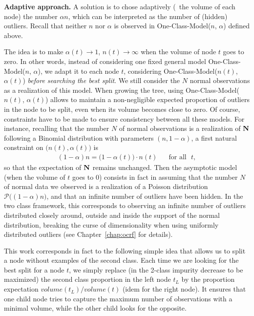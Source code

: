 \textbf{Adaptive approach.}
%
A solution is to chose adaptively (\wrt~the volume of each node) the number $\alpha n$, which can be interpreted as the number of (hidden) outliers. Recall that neither $n$ nor $\alpha$ is observed in One-Class-Model($n$, $\alpha$) defined above. 

The idea is to make $\alpha(t) \to 1$, $n(t) \to \infty$ when the volume of node $t$ goes to zero.
%
In other words, instead of considering one fixed general model One-Class-Model($n$, $\alpha$), we adapt it to each node $t$, considering One-Class-Model($n(t)$, $\alpha(t)$) \emph{before searching the best split}. We still consider the $N$ normal observations as a realization of this model. When growing the tree, using One-Class-Model($n(t)$, $\alpha(t)$) allows to maintain a non-negligible expected proportion of outliers in the node to be split, even when its volume becomes close to zero.
Of course, constraints have to be made to ensure consistency between all these models.
%
For instance, recalling that the number $N$ of normal observations is a realization of $\mathbf N$ following a Binomial distribution with parameters $(n, 1-\alpha)$, a first natural constraint on $\big(n(t), \alpha(t)\big)$ is
\begin{align}
\label{resume_fr:constraint1}
(1-\alpha)n = \big(1-\alpha(t)\big) \cdot n(t) \text{~~~~~for all~~} t,
\end{align}
so that the expectation of $\mathbf N$ remains unchanged. 
Then the asymptotic model (when the volume of $t$ goes to $0$) consists in fact in assuming that the number $N$ of normal data we observed is a realization of a Poisson distribution $\mathcal{P}\big((1-\alpha)n\big)$, and that an infinite number of outliers have been hidden. In the two class framework, this corresponds to observing an infinite number of outliers distributed closely around, outside and inside the support of the normal distribution, breaking the curse of dimensionality when using uniformly distributed outliers (see Chapter~\ref{chap:ocrf} for details).

\begin{remarque}
This work corresponds in fact to the following simple idea that allows us to split a node without examples of the second class.
Each time we are looking for the best split for a node $t$, we simply replace (in the 2-class impurity decrease to be maximized) the second class proportion in the left node $t_L$ by the proportion expectation $volume(t_L)/volume(t)$ (idem for the right node).
It ensures that one child node tries to capture the maximum number of observations with a minimal volume, while the other child looks for the opposite. %
\end{remarque}


